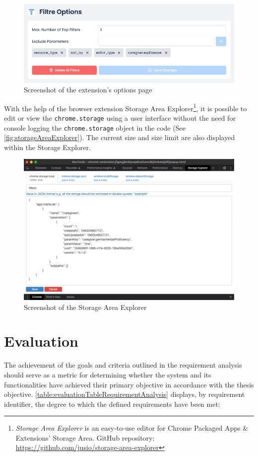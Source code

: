 \begin{figure}[H]
  \includegraphics[width=\textwidth]{assets/screenshot_filtre_options_page.png}
  \caption{Screenshot of the extension's options page}
  \label{fig:filtreOptionsPage}
\end{figure}

With the help of the browser extension Storage Area Explorer\footnote{\emph{Storage Area Explorer} is an easy-to-use editor for Chrome Packaged Apps \& Extensions' Storage Area. GitHub repository: \url{https://github.com/jusio/storage-area-explorer}}, it is possible to edit or view the \texttt{chrome.storage} using a user interface without the need for console logging the \texttt{chrome.storage} object in the code (See \autoref{fig:storageAreaExplorer}). The current size and size limit are also displayed within the Storage Explorer.

\begin{figure}[H]
  \includegraphics[width=\textwidth]{assets/screenschot_storage_area_explorer.png}
  \caption{Screenshot of the Storage Area Explorer}
  \label{fig:storageAreaExplorer}
\end{figure}

\section{Evaluation}
The achievement of the goals and criteria outlined in the requirement analysis should serve as a metric for determining whether the system and its functionalities have achieved their primary objective in accordance with the thesis objective. \autoref{table:evaluationTableRequirementAnalysis} displays, by requirement identifier, the degree to which the defined requirements have been met:

